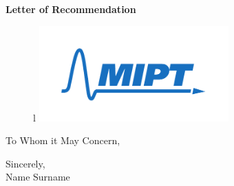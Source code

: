 \documentclass{letter}
\date{}
\begin{document}
\begin{letter}
{
\centering \Large \textbf{Letter of Recommendation}
}

\hfill
\begin{figure}[1]{l}%
    \centering
    \includegraphics[width=0.65\textwidth]{eng.pdf}
\end{figure}

\opening{To Whom it May Concern,} %
\medskip 

\lipsum[1-5]

\medskip
Sincerely, \\
Name Surname \\

\end{letter}
\end{document}
